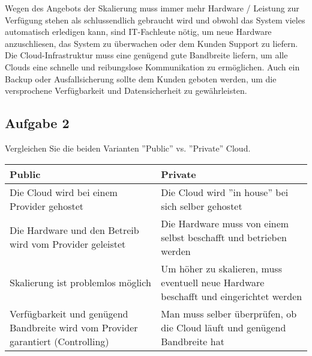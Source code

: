\documentclass[11pt,titlepage]{article}
\newenvironment{shadedquotation}
 {\begin{shaded*}
  \quoting[leftmargin=0pt, vskip=0pt]
 }
 {\endquoting
 \end{shaded*}
}
\begin{document}
\par\medskip

Wegen des Angebots der Skalierung muss immer mehr Hardware / Leistung zur Verfügung stehen als schlussendlich gebraucht wird und obwohl das System vieles automatisch erledigen kann, sind IT-Fachleute nötig, um neue Hardware anzuschliesen, das System zu überwachen oder dem Kunden Support zu liefern.
Die Cloud-Infrastruktur muss eine genügend gute Bandbreite liefern, um alle Clouds eine schnelle und reibungslose Kommunikation zu ermöglichen.
Auch ein Backup oder Ausfallsicherung sollte dem Kunden geboten werden, um die versprochene Verfügbarkeit und Datensicherheit zu gewährleisten.

\par\medskip

\subsection{Aufgabe 2}
\label{sec:Aufgabe-2}

\begin{shadedquotation}
  Vergleichen Sie die beiden Varianten ''Public'' vs. ''Private'' Cloud.
\end{shadedquotation}

\par\medskip

\begin{tabular}{ |p{7cm}|p{7cm}|  }
  \hline
  Public & Private \\
  \hline
  Die Cloud wird bei einem Provider gehostet &
  Die Cloud wird ''in house'' bei sich selber gehostet \par \\

  Die Hardware und den Betreib wird vom Provider geleistet &
  Die Hardware muss von einem selbst beschafft und betrieben werden \par \\

  Skalierung ist problemlos möglich &
  Um höher zu skalieren, muss eventuell neue Hardware beschafft und eingerichtet werden \par \\

  Verfügbarkeit und genügend Bandbreite wird vom Provider garantiert (Controlling) &
  Man muss selber überprüfen, ob die Cloud läuft und genügend Bandbreite hat \par \\

  \hline
\end{tabular}
\end{document}
